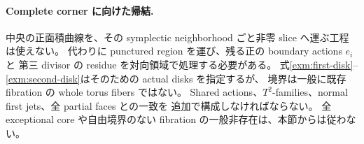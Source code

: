 \paragraph{Complete corner に向けた帰結.}
中央の正面積曲線を、その symplectic neighborhood ごと非零 slice へ運ぶ工程は使えない。
代わりに punctured region を運び、残る正の boundary actions $e_i$ と
第三 divisor の residue を対向領域で処理する必要がある。
式\eqref{exm:first-disk}--\eqref{exm:second-disk}はそのための actual disks を指定するが、
境界は一般に既存 fibration の whole torus fibers ではない。
Shared actions、$T^2$-families、normal first jets、全 partial faces との一致を
追加で構成しなければならない。
全 exceptional core や自由境界のない fibration の一般非存在は、本節からは従わない。
